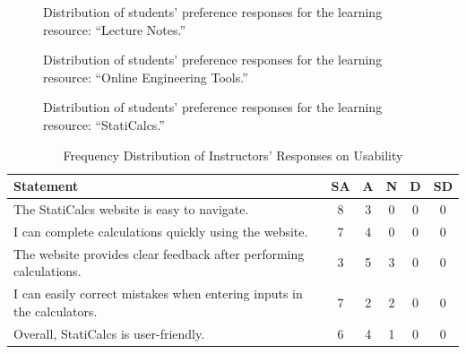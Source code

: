 \begin{figure}[H]
\centering
{}
\caption{Distribution of students' preference responses for the learning resource: ``Lecture Notes.''}
\end{figure}


\begin{figure}[H]
\centering
{}
\caption{Distribution of students' preference responses for the learning resource: ``Online Engineering Tools.''}
\end{figure}


\begin{figure}[H]
\centering
{}
\caption{Distribution of students' preference responses for the learning resource: ``StatiCalcs.''}
\end{figure}


\begin{table}[H]
\centering
\caption{Frequency Distribution of Instructors’ Responses on Usability}
\renewcommand{\arraystretch}{1.3}
\begin{tabular}{p{8cm}ccccc}
\hline
\textbf{Statement} & \textbf{SA} & \textbf{A} & \textbf{N} & \textbf{D} & \textbf{SD}\\
\hline
The StatiCalcs website is easy to navigate. & 8 & 3 & 0 & 0 & 0\\
I can complete calculations quickly using the website. & 7 & 4 & 0 & 0 & 0\\
The website provides clear feedback after performing calculations. & 3 & 5 & 3 & 0 & 0\\
I can easily correct mistakes when entering inputs in the calculators. & 7 & 2 & 2 & 0 & 0\\
Overall, StatiCalcs is user-friendly. & 6 & 4 & 1 & 0 & 0\\
\hline
\end{tabular}
\end{table}

